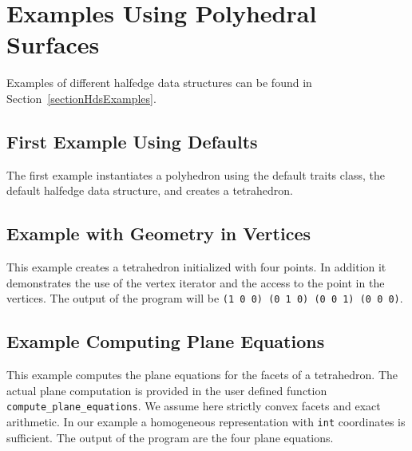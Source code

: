 \newpage
\section{Examples Using Polyhedral Surfaces}
\label{sectionPolyExamples}

Examples of different halfedge data structures can be found in
Section~\ref{sectionHdsExamples}.


\subsection{First Example Using Defaults}

The first example instantiates a polyhedron using the default traits
class, the default halfedge data structure, and creates a tetrahedron.


\subsection{Example with Geometry in Vertices}

This example creates a tetrahedron initialized with four points. In
addition it demonstrates the use of the vertex iterator and the access
to the point in the vertices. The output of
the program will be {\tt (1 0 0) (0 1 0) (0 0 1) (0 0 0)}.


\subsection{Example Computing Plane Equations}

This example computes the plane equations for the facets of a tetrahedron.
The actual plane computation is provided in the user defined function
{\tt compute\_plane\_equations}. We assume
here strictly convex facets and exact arithmetic. In our example a
homogeneous representation with {\tt int} coordinates is sufficient.
The output of the program are the four plane equations.

